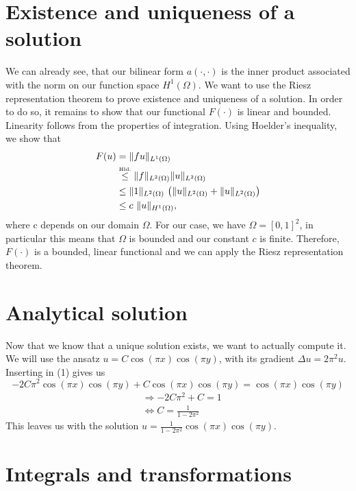 \documentclass[a4paper,12pt]{report}
\begin{document}
\section{Existence and uniqueness of a solution}

We can already see, that our bilinear form $a(\cdotp ,\cdot)$ is the inner product associated with the norm on our function space $H^1(\Omega)$. We want to use the Riesz representation theorem to prove existence and uniqueness of a solution. In order to do so, it remains to show that our functional $F(\cdot)$ is linear and bounded. Linearity follows from the properties of integration. Using Hoelder's inequality, we show that
\begin{align*}
F(u)&=\|fu\|_{L^1(\Omega)}\\
	&\stackrel{\tiny\mbox{Hld.}}{\le} \|f\|_{L^2(\Omega)}\|u\|_{L^2(\Omega)}\\
	&\le \|1\|_{L^2(\Omega)}\ \big(\|u\|_{L^2(\Omega)}+\|u\|_{L^2(\Omega)}\big)\\
	&\le c\ \|u\|_{H^1(\Omega)}\mbox{,}
\end{align*}
where c depends on our domain $\Omega$. For our case, we have $\Omega=[0,1]^2$, in particular this means that $\Omega$ is bounded and our constant $c$ is finite. Therefore, $F(\cdot)$ is a bounded, linear functional and we can apply the Riesz representation theorem.

\section{Analytical solution}

Now that we know that a unique solution exists, we want to actually compute it. We will use the ansatz $u=C\cos(\pi x)\cos(\pi y)$, with its gradient $\Delta u=2\pi^2 u$. Inserting in (1) gives us
\begin{equation}
-2C\pi^2 \cos(\pi x)\cos(\pi y) + C\cos(\pi x)\cos(\pi y)=\cos(\pi x)\cos(\pi y)
\end{equation}
\begin{align}
&\Rightarrow - 2C\pi^2 + C =1\\
&\Leftrightarrow C = \frac{1}{1-2\pi^2}
\end{align}
This leaves us with the solution $u=\frac{1}{1-2\pi^2}\cos(\pi x)\cos(\pi y)$.

\section{Integrals and transformations}
\end{document}
